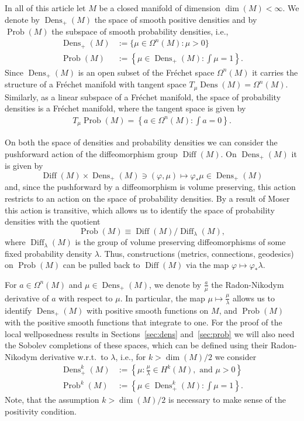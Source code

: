 \documentclass[11pt]{amsart}
\theoremstyle{definition}
\newcommand{\dx}{\lambda}
\newcommand{\Prob}{\operatorname{Prob}(M)}
\newcommand{\Probk}{\operatorname{Prob}^k(M)}
\newcommand{\Dens}{\operatorname{Dens}_+(M)}
\newcommand{\Densk}{\operatorname{Dens}^k_+(M)}
\newcommand{\Diff}{\operatorname{Diff}(M)}
\newcommand{\SDiff}{\operatorname{Diff}_{\dx}(M)}
\begin{document}
In all of this article let $M$ be a closed manifold of dimension $\operatorname{dim}(M)<\infty$. 
We denote by $\Dens$ the space of smooth positive densities and by $\Prob$ the subspace of smooth probability densities, i.e., 
\begin{align*}
\Dens&:=\{\mu\in \Omega^n(M) : \mu>0\}\\
\Prob&:=\left\{\mu\in \Dens : \int\mu=1\right\}.
\end{align*}
Since $\Dens$ is an open subset of the Fr\'echet space $\Omega^n(M)$ it carries the structure of a Fr\'echet manifold with tangent space $T_{\mu}\operatorname{Dens}(M)=\Omega^n(M)$.
Similarly, as a linear subspace of a Fr\'echet manifold,  the space of probability densities is a Fr\'echet manifold, where the tangent space is given by 
\begin{align*}
T_{\mu}\Prob=\left\{a \in \Omega^n(M):\int a=0\right\}.
\end{align*}


On both the space of  densities and probability densities
we can consider the pushforward action of the diffeomorphism group $\Diff$.  On $\Dens$ it is given by
\begin{equation}\label{eq:pushforward}
\Diff\times \Dens\ni (\varphi,\mu)\mapsto \varphi_*\mu \in \Dens
\end{equation}
and, since the pushforward by a diffeomorphism is volume preserving, this action restricts to an action on the space of probability densities. 
By a result of Moser~\cite{moser1965volume} this action is transitive, which allows us to identify the space of probability densities with the quotient
\begin{equation}
\Prob\equiv \Diff/\SDiff, 
\end{equation}
where $\SDiff$ is the group of volume preserving diffeomorphisms of some fixed probability density $\dx$. 
Thus, constructions (metrics, connections, geodesics) on $\Prob$ can be pulled back to $\Diff$ via the map $\varphi\mapsto \varphi_*\dx$.

For $a\in \Omega^n(M)$ and $\mu\in \Dens$, we denote by $\frac{a}{\mu}$ the Radon-Nikodym derivative of $a$ with respect to $\mu$.
In particular, the map $\mu \mapsto \frac{\mu}{\dx}$ allows us to identify $\Dens$ with positive smooth functions on $M$, and $\Prob$ with the positive smooth functions that integrate to one.
For the proof of the local wellposedness results in Sections~\ref{sec:dens} and~\ref{sec:prob} we will also need the Sobolev completions of these spaces, which can be defined using their  Radon-Nikodym derivative w.r.t.\ to $\dx$, i.e., for $k>\operatorname{dim}(M)/2$ we consider
\begin{align*}
\Densk&:=\left\{\mu:\frac{\mu}{\dx}\in H^{k}(M), \text{ and } \mu>0\right\}\\
\Probk&:=\left\{\mu\in \Densk : \int\mu=1\right\}.
\end{align*}
Note, that the assumption  $k>\operatorname{dim}(M)/2$ is necessary to make sense of the positivity condition.
\end{document}
